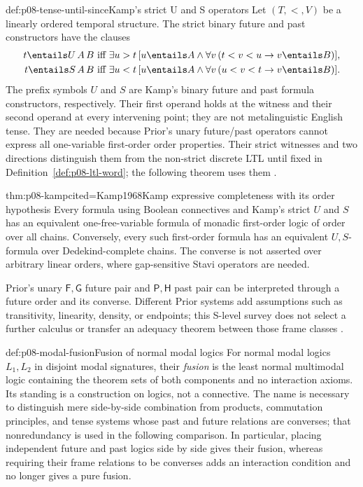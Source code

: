 \begin{hbdefinition}{def:p08-tense-until-since}{Kamp's strict U and S operators}
Let \((T,<,V)\) be a linearly ordered temporal structure.  The strict binary
future and past constructors have the clauses
\[
\begin{aligned}
 t\entails U\,A\,B
 &\text{ iff }
 \exists u>t\,[u\entails A\land
   \forall v\,(t<v<u\to v\entails B)],\\
 t\entails S\,A\,B
 &\text{ iff }
 \exists u<t\,[u\entails A\land
   \forall v\,(u<v<t\to v\entails B)].
\end{aligned}
\]
The prefix symbols \(U\) and \(S\) are Kamp's binary future and past formula
constructors, respectively.  Their first operand holds at the witness and
their second operand at every intervening point; they are not metalinguistic
English tense.  They
are needed because Prior's unary future/past operators cannot express all
one-variable first-order order properties.  Their strict witnesses and two
directions distinguish them from the non-strict discrete LTL until fixed in
Definition~\ref{def:p08-ltl-word}; the following theorem uses them
\cite{Prior1967,Kamp1968}.
\end{hbdefinition}

\begin{hbtheorem}{thm:p08-kamp}{cited=Kamp1968}{Kamp expressive completeness with its order hypothesis}
Every formula using Boolean connectives and Kamp's strict \(U\) and
\(S\) has an
equivalent one-free-variable formula of monadic first-order logic of order over
all chains.  Conversely, every such first-order formula has an equivalent
\(U,S\)-formula over Dedekind-complete chains.  The converse is not asserted
over arbitrary linear orders, where gap-sensitive Stavi operators are needed.
\end{hbtheorem}

Prior's unary \(\mathsf F,\mathsf G\) future pair and
\(\mathsf P,\mathsf H\) past pair can be interpreted through a future order
and its converse.  Different Prior systems add assumptions such as
transitivity, linearity, density, or endpoints; this S-level survey does not
select a further calculus or transfer an adequacy theorem between those frame
classes \cite{Prior1967,Burgess1984}.

\begin{hbdefinition}{def:p08-modal-fusion}{Fusion of normal modal logics}
For normal modal logics \(L_1,L_2\) in disjoint modal signatures, their
\emph{fusion} is the least normal multimodal logic containing the theorem sets
of both components and no interaction axioms.  Its standing is a construction
on logics, not a connective.  The name is necessary to distinguish mere
 side-by-side combination from products, commutation principles, and tense
 systems whose past and future relations are converses; that nonredundancy is
 used in the following comparison.  In particular, placing independent future
 and past logics side by side gives their fusion, whereas requiring their frame
 relations to be converses adds an interaction condition and no longer gives a
 pure fusion.
\end{hbdefinition}

